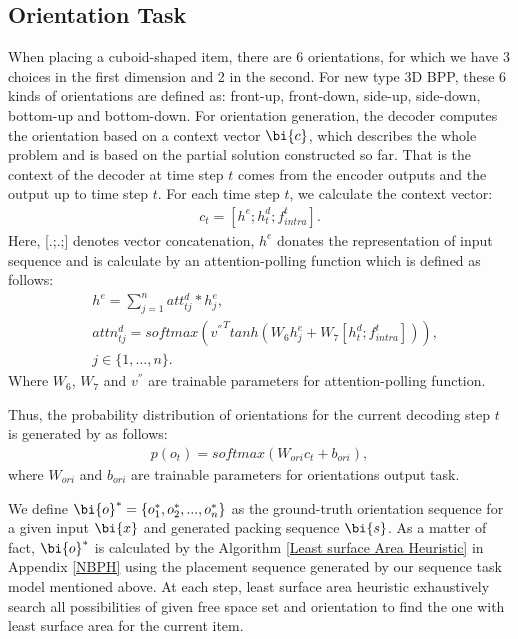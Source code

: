 \subsection{Orientation Task}
When placing a cuboid-shaped item, there are 6 orientations, for which we have 3 choices in the first dimension and 2 in the second. For new type 3D BPP, these 6 kinds of orientations are defined as: front-up, front-down, side-up, side-down, bottom-up and bottom-down. For orientation generation, the decoder computes the orientation based on a context vector $\bi{c}$,
which describes the whole problem and is based on the partial solution constructed so far. That is the context of the decoder at time step $t$ comes from the encoder outputs and the output up to time step $t$. For each time step $t$, we calculate the context vector:
\begin{eqnarray*}\label{4}
 	c_t = [h^{e};h_{t}^{d};f_{intra}^{t}].
\end{eqnarray*}
Here, [.;.;] denotes vector concatenation,
$h^{e}$ donates the representation of input sequence and is calculate by an attention-polling function which is defined as follows:
\begin{eqnarray*}
	&h^{e} = \sum_{j=1}^{n}{att_{tj}^{d} * h_{j}^e}, \\
	&attn_{tj}^{d} = softmax({v^{''}}^{T}tanh(W_{6}h_{j}^{e} + W_{7}{[h_{t}^{d};f_{intra}^{t}]})), \\
	& j \in \{1,\dots,n\}.
\end{eqnarray*}
Where $W_{6}$, $W_{7}$ and $v^{''}$ are trainable parameters for attention-polling function.

Thus, the probability distribution of orientations for the current decoding step $t$ is generated by as follows:
\begin{eqnarray*}\label{5}
	p(o_{t}) = softmax(W_{ori}c_t + b_{ori}),
\end{eqnarray*}
where $W_{ori}$ and $b_{ori}$ are trainable parameters for orientations output task.

We define $\bi{o}^{*} = \{o_{1}^{*},o_{2}^{*}, ..., o_{n}^{*}\}$ as the ground-truth orientation sequence for a given input $\bi{x}$ and generated packing sequence $\bi{s}$. As a matter of fact, $\bi{o}^{*}$ is calculated by the Algorithm \ref{Least surface Area Heuristic} in Appendix \ref{NBPH} %
using the placement sequence generated by our sequence task model mentioned above.
At each step, least surface area heuristic exhaustively search all possibilities of given free space set and orientation to find the one with least surface area for the current item.  

